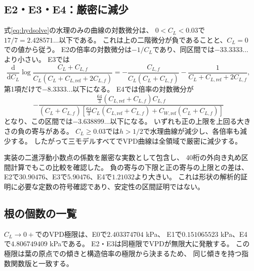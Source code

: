 \documentclass[a4paper,11pt]{ltjsarticle}
\newcommand{\dd}{\mathrm{d}}
\begin{document}
\subsection{E2・E3・E4：厳密に減少}
式\eqref{eq:hydsolve}の水理のみの曲線の対数微分は、
$0<C_L<0.03$で$17/7=2.428571\ldots$以下である。
これは上の二階微分が負であることと、$C_L=0$での値から従う。
E2の倍率の対数微分は$-1/C_L$であり、同区間では$-33.3333\ldots$より小さい。
E3では
\begin{equation}
 \frac{\dd}{\dd C_L}
 \log\frac{C_L+C_{L,f}}{C_L(C_L+C_{L,\mathrm{ref}}+2C_{L,f})}
 =-\frac{C_{L,f}}{C_L(C_L+C_{L,f})}
   -\frac1{C_L+C_{L,\mathrm{ref}}+2C_{L,f}},
\end{equation}
第1項だけで$-8.3333\ldots$以下になる。
E4では倍率の対数微分が
\begin{equation}
 -\frac{\frac{64}{3}(C_{L,\mathrm{ref}}+C_{L,f})C_{L,f}}
 {(C_L+C_{L,f})
 [\frac{64}{3}C_L(C_{L,\mathrm{ref}}+C_{L,f})
                  +C_{W,\mathrm{ref}}(C_L+C_{L,f})]}
\end{equation}
となり、この区間では$-3.638899\ldots$以下になる。
いずれも正の上限を上回る大きさの負の寄与がある。
$C_L\geq0.03$では$h>1/2$で水理曲線が減少し、各倍率も減少する。
したがって三モデルすべてでVPD曲線は全領域で厳密に減少する。

実装の二進浮動小数点の係数を厳密な実数として包含し、
40桁の外向き丸め区間計算でもこの比較を確認した。
負の寄与の下限と正の寄与の上限との差は、
E2で$30.90476$、E3で$5.90476$、E4で$1.21032$より大きい。
これは形状の解析的証明に必要な定数の符号確認であり、安定性の区間証明ではない。

\subsection{根の個数の一覧}
$C_L\to0+$でのVPD極限は、E0で$2.403374704$ kPa、
E1で$0.151065523$ kPa、E4で$4.806749409$ kPaである。
E2・E3は同極限でVPDが無限大に発散する。
この極限は葉の原点での傾きと構造倍率の極限から決まるため、
同じ傾きを持つ指数関数版と一致する。
\end{document}
